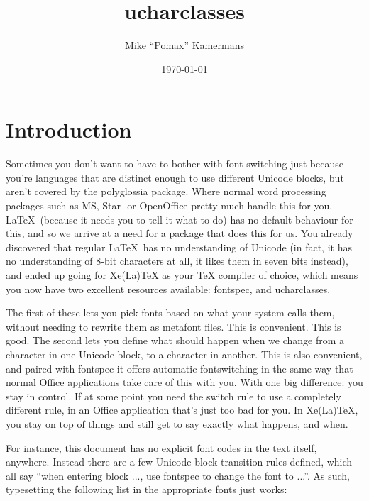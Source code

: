 ﻿\documentclass{article}
\begin{document}
	\title{ucharclasses}
	\author{Mike “Pomax” Kamermans}
	\date{\today}
	\maketitle

	\tableofcontents

	\pagebreak

	\section{Introduction}
	
		Sometimes you don't want to have to bother with font switching just because you're languages that are distinct enough to use different Unicode blocks, but aren't covered by the polyglossia package. Where normal word processing packages such as MS, Star- or OpenOffice pretty much handle this for you, \LaTeX\ (because it needs you to tell it what to do) has no default behaviour for this, and so we arrive at a need for a package that does this for us. You already discovered that regular \LaTeX\ has no understanding of Unicode (in fact, it has no understanding of 8-bit characters at all, it likes them in seven bits instead), and ended up going for Xe(La)TeX as your TeX compiler of choice, which means you now have two excellent resources available: fontspec, and ucharclasses.
		
		The first of these lets you pick fonts based on what your system calls them, without needing to rewrite them as metafont files. This is convenient. This is good. The second lets you define what should happen when we change from a character in one Unicode block, to a character in another. This is also convenient, and paired with fontspec it offers automatic fontswitching in the same way that normal Office applications take care of this with you. With one big difference: you stay in control. If at some point you need the switch rule to use a completely different rule, in an Office application that's just too bad for you. In Xe(La)TeX, you stay on top of things and still get to say exactly what happens, and when.
		
		For instance, this document has no explicit font codes in the text itself, anywhere. Instead there are a few Unicode block transition rules defined, which all say “when entering block ..., use fontspec to change the font to ...”. As such, typesetting the following list in the appropriate fonts just works:
		
\end{document}
